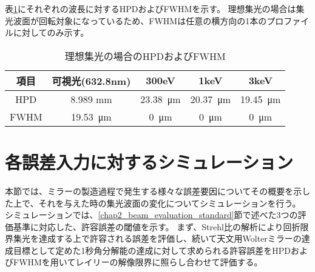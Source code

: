 \begin{comment}
\begin{figure}[!ht]
\centering

\subfloat[可視光(632.8nm)]{
    \texttt{[image: ideal/visible\_light\_focus\_abs.png]}
    \label{fig:visible_light_ideal_focus_abs}
}
\subfloat[300eV]{
    \centering
    \texttt{[image: ideal/300eV\_focus\_abs.png]}
    \label{fig:300eV_ideal_focus_abs}
}
\subfloat[1keV]{
    \centering
    \texttt{[image: ideal/1keV\_focus\_abs.png]}
    \label{fig:1keV_ideal_focus_abs}
}
\subfloat[3keV]{
    \centering
    \texttt{[image: ideal/3keV\_focus\_abs.png]}
    \label{fig:3keV_ideal_focus_abs}
}
\caption[]{理想的なミラーの各波長に対する集光波面}
\label{fig:fwhm_explanation}
\end{figure}
\end{comment}

表\ref{tb:ideal_focus_evaluation}にそれぞれの波長に対するHPDおよびFWHMを示す。
理想集光の場合は集光波面が回転対象になっているため、FWHMは任意の横方向の1本のプロファイルに対してのみ示す。

\begin{table}[!ht]
\begin{center}
  \begin{tabular}{|c|c|c|c|c|} \hline
    項目 & 可視光(632.8nm) & 300eV & 1keV & 3keV \\ \hline
    HPD & 8.989 mm & \SI{23.38}{\micro \metre} & \SI{20.37}{\micro \metre} & \SI{19.45}{\micro \metre} \\
    FWHM & \SI{19.53}{\micro \metre} & \SI{0}{\micro \metre} & \SI{0}{\micro \metre} & \SI{0}{\micro \metre} \\ \hline
  \end{tabular}
  \caption{理想集光の場合のHPDおよびFWHM}
  \label{tb:ideal_focus_evaluation}
\end{center}
\end{table}

\clearpage
\newpage

\section{各誤差入力に対するシミュレーション}
\label{chap2_simulation_error_response}

本節では、ミラーの製造過程で発生する様々な誤差要因についてその概要を示した上で、それを与えた時の集光波面の変化についてシミュレーションを行う。
シミュレーションでは、\ref{chap2_beam_evaluation_standard}節で述べた3つの評価基準に対応した、許容誤差の閾値を示す。
まず、Strehl比の解析により回折限界集光を達成する上で許容される誤差を評価し、続いて天文用Wolterミラーの達成目標として定めた1秒角分解能の達成に対して求められる許容誤差をHPDおよびFWHMを用いてレイリーの解像限界に照らし合わせて評価する。

